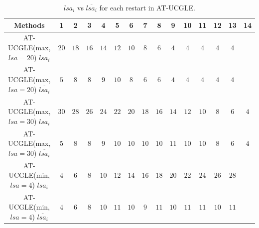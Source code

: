 \begin{table}[htbp]
	\renewcommand{\arraystretch}{1.4}
	\footnotesize	
	\caption{$lsa_i$ vs $\overline{lsa_i}$ for each restart in AT-UCGLE.}
	\label{table:autotuning2}
	\centering
	\begin{tabular}{c|c|c|c|c|c|c|c|c|c|c|c|c|c|c}
		\toprule
		\cellcolor{gray!50}Methods & \cellcolor{gray!50}1 & \cellcolor{gray!50}2&\cellcolor{gray!50}3&\cellcolor{gray!50}4&\cellcolor{gray!50}5&\cellcolor{gray!50}6&\cellcolor{gray!50}7 &\cellcolor{gray!50}8&\cellcolor{gray!50}9&\cellcolor{gray!50}10&\cellcolor{gray!50}11&\cellcolor{gray!50}12&\cellcolor{gray!50}13&\cellcolor{gray!50}14\\
		\midrule
		AT-UCGLE(max, $lsa=20$)  $lsa_{i}$&$20$&$18$ &$16$&$14$&$12$&$10$&$8$&$6$&$4$&$4$&$4$&$4$&$4$&\\
		\cellcolor{gray!20}AT-UCGLE(max, $lsa=20$) $\overline{lsa_{i}}$& \cellcolor{gray!20}$5$ & \cellcolor{gray!20}$8$&\cellcolor{gray!20}$8$&\cellcolor{gray!20}$9$&\cellcolor{gray!20}$10$&\cellcolor{gray!20}$8$&\cellcolor{gray!20}$6$&\cellcolor{gray!20}$6$&\cellcolor{gray!20}$4$&\cellcolor{gray!20}$4$&\cellcolor{gray!20}$4$&\cellcolor{gray!20}$4$&\cellcolor{gray!20}$4$&\cellcolor{gray!20}  \\
		AT-UCGLE(max, $lsa=30$) $lsa_{i}$& $30$ & $28$&$26$&$24$&$22$&$20$&$18$&$16$&$14$&$12$&$10$&$8$&$6$&$4$   \\
		\cellcolor{gray!20}AT-UCGLE(max, $lsa=30$)  $\overline{lsa_{i}}$&\cellcolor{gray!20}$5$&\cellcolor{gray!20}$8$ &\cellcolor{gray!20}$8$&\cellcolor{gray!20}$9$&\cellcolor{gray!20}$10$&\cellcolor{gray!20}$10$&\cellcolor{gray!20}$10$&\cellcolor{gray!20}$10$&\cellcolor{gray!20}$11$&\cellcolor{gray!20}$10$&\cellcolor{gray!20}$10$&\cellcolor{gray!20}$8$&\cellcolor{gray!20}$6$&\cellcolor{gray!20}$4$\\
		AT-UCGLE(min, $lsa=4$) $lsa_{i}$& $4$ & $6$&$8$&$10$&$12$&$14$&$16$&$18$&$20$&$22$&$24$&$26$&$28$&    \\
		\cellcolor{gray!20}AT-UCGLE(min, $lsa=4$) $\overline{lsa_{i}}$&\cellcolor{gray!20}$4$ &\cellcolor{gray!20}$6$&\cellcolor{gray!20}$8$&\cellcolor{gray!20}$10$&\cellcolor{gray!20}$11$&\cellcolor{gray!20}$10$&\cellcolor{gray!20}$9$&\cellcolor{gray!20}$11$&\cellcolor{gray!20}$10$&\cellcolor{gray!20}$11$&\cellcolor{gray!20}$11$&\cellcolor{gray!20}$10$&\cellcolor{gray!20}$11$&\cellcolor{gray!20}    \\
		
		\bottomrule
	\end{tabular}
\end{table}

